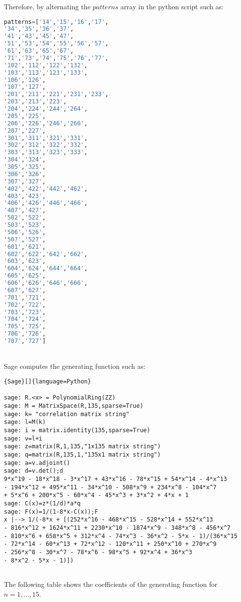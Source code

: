 \documentclass[12pt]{report}
\begin{document}
{{\noindent Therefore, by alternating the $patterns$ array in the python script such as: \\
{
\begin{lstlisting}[language=Python]
patterns=['14','15','16','17',
'34','35','36','37',
'41','43','45','47',
'51','53','54','55','56','57',
'61','63','65','67',
'71','73','74','75','76','77',
'102','112','122','132',
'103','113','123','133',
'106','126',
'107','127',
'201','211','221','231','233',
'203','213','223',
'204','224','244','264',
'205','225',
'206','226','246','266',
'207','227',
'301','311','321','331',
'302','312','322','332',
'303','313','323','333',
'304','324',
'305','325',
'306','326',
'307','327',
'402','422','442','462',
'403','423',
'406','426','446','466',
'407','427',
'502','522',
'503','523',
'506','526',
'507','527',
'601','621',
'602','622','642','662',
'603','623',
'604','624','644','664',
'605','625',
'606','626','646','666',
'607','627',
'701','721',
'702','722',
'703','723',
'704','724',
'705','725',
'706','726',
'707','727']

\end{lstlisting}} \quad \\

\noindent Sage computes the generating function such as:
{
\begin{lstlisting}{Sage}[]{language=Python}

sage: R.<x> = PolynomialRing(ZZ)
sage: M = MatrixSpace(R,135,sparse=True)
sage: k= "correlation matrix string"
sage: l=M(k)
sage: i = matrix.identity(135,sparse=True)         
sage: v=l+i
sage: z=matrix(R,1,135,"1x135 matrix string")
sage: q=matrix(R,135,1,"135x1 matrix string")
sage: a=v.adjoint()
sage: d=v.det();d
9*x^19 - 18*x^18 - 3*x^17 + 43*x^16 - 78*x^15 + 54*x^14 - 4*x^13 
- 194*x^12 + 495*x^11 - 34*x^10 - 508*x^9 + 234*x^8 - 104*x^7 
+ 5*x^6 + 200*x^5 - 60*x^4 - 45*x^3 + 3*x^2 + 4*x + 1
sage: C(x)=z*(1/d)*a*q
sage: F(x)=1/(1-8*x-C(x));F
x |--> 1/(-8*x + [(252*x^16 - 468*x^15 - 528*x^14 + 552*x^13 
- 816*x^12 + 1624*x^11 + 2230*x^10 - 1874*x^9 - 348*x^8 - 456*x^7 
- 810*x^6 + 658*x^5 + 312*x^4 - 74*x^3 - 36*x^2 - 5*x - 1)/(36*x^15 
- 72*x^14 - 60*x^13 + 72*x^12 - 120*x^11 + 250*x^10 + 270*x^9 
- 256*x^8 - 30*x^7 - 78*x^6 - 98*x^5 + 92*x^4 + 36*x^3 
- 8*x^2 - 5*x - 1)])


\end{lstlisting}}

\noindent The following table shows the coefficients of the generating function for $n=1,\ldots,15$.

}}
\end{document}
